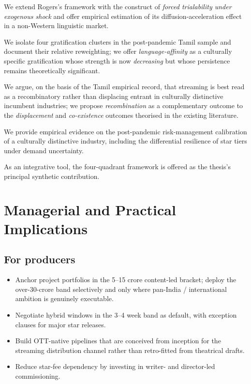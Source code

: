 \begin{description}[style=nextline,leftmargin=2.4em]
\item[To Diffusion-of-Innovations theory.]  We extend Rogers's
       \citeyearpar{rogers2003} framework with the construct of
       \emph{forced trialability under exogenous shock} and offer
       empirical estimation of its diffusion-acceleration effect
       in a non-Western linguistic market.
\item[To Uses-and-Gratifications theory.]  We isolate four
       gratification clusters in the post-pandemic Tamil sample
       and document their relative reweighting; we offer
       \emph{language-affinity} as a culturally specific
       gratification whose strength is now \emph{decreasing} but
       whose persistence remains theoretically significant.
\item[To Disruptive-Innovation theory.]  We argue, on the basis of
       the Tamil empirical record, that streaming is best read as
       a recombinatory rather than displacing entrant in
       culturally distinctive incumbent industries; we propose
       \emph{recombination} as a complementary outcome to the
       \emph{displacement} and \emph{co-existence} outcomes
       theorised in the existing literature.
\item[To the Cultural-Industries paradigm.]  We provide empirical
       evidence on the post-pandemic risk-management calibration of
       a culturally distinctive industry, including the differential
       resilience of star tiers under demand uncertainty.
\item[Hybrid-Equilibrium framework.]  As an integrative tool, the
       four-quadrant framework is offered as the thesis's principal
       synthetic contribution.
\end{description}

\section{Managerial and Practical Implications}
\label{sec:managerial}

\subsection{For producers}

\begin{itemize}[itemsep=2pt]
\item Anchor project portfolios in the 5--15 crore content-led
      bracket; deploy the over-30-crore band selectively and only
      where pan-India / international ambition is genuinely
      executable.
\item Negotiate hybrid windows in the 3--4 week band as default,
      with exception clauses for major star releases.
\item Build OTT-native pipelines that are conceived from inception
      for the streaming distribution channel rather than retro-fitted
      from theatrical drafts.
\item Reduce star-fee dependency by investing in writer- and
      director-led commissioning.
\end{itemize}

